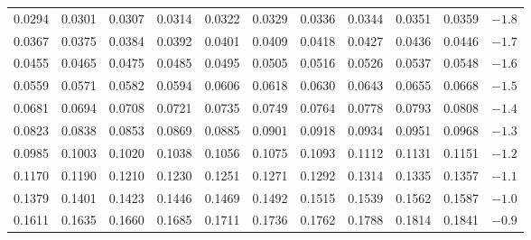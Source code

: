 \begin{table}[p]
\begin{center}
{\begin{tabular}{| rrrrr | rrrrr | c}
  \scriptsize{0.0294} & \scriptsize{0.0301} & \scriptsize{0.0307} & \scriptsize{0.0314} & \scriptsize{0.0322} & \scriptsize{0.0329} & \scriptsize{0.0336} & \scriptsize{0.0344} & \scriptsize{0.0351} & \scriptsize{0.0359} & $-1.8$ \\
  \scriptsize{0.0367} & \scriptsize{0.0375} & \scriptsize{0.0384} & \scriptsize{0.0392} & \scriptsize{0.0401} & \scriptsize{0.0409} & \scriptsize{0.0418} & \scriptsize{0.0427} & \scriptsize{0.0436} & \scriptsize{0.0446} & $-1.7$ \\
  \scriptsize{0.0455} & \scriptsize{0.0465} & \scriptsize{0.0475} & \scriptsize{0.0485} & \scriptsize{0.0495} & \scriptsize{0.0505} & \scriptsize{0.0516} & \scriptsize{0.0526} & \scriptsize{0.0537} & \scriptsize{0.0548} & $-1.6$ \\
  \scriptsize{0.0559} & \scriptsize{0.0571} & \scriptsize{0.0582} & \scriptsize{0.0594} & \scriptsize{0.0606} & \scriptsize{0.0618} & \scriptsize{0.0630} & \scriptsize{0.0643} & \scriptsize{0.0655} & \scriptsize{0.0668} & $-1.5$ \\
    \hline
  \scriptsize{0.0681} & \scriptsize{0.0694} & \scriptsize{0.0708} & \scriptsize{0.0721} & \scriptsize{0.0735} & \scriptsize{0.0749} & \scriptsize{0.0764} & \scriptsize{0.0778} & \scriptsize{0.0793} & \scriptsize{0.0808} & $-1.4$ \\
  \scriptsize{0.0823} & \scriptsize{0.0838} & \scriptsize{0.0853} & \scriptsize{0.0869} & \scriptsize{0.0885} & \scriptsize{0.0901} & \scriptsize{0.0918} & \scriptsize{0.0934} & \scriptsize{0.0951} & \scriptsize{0.0968} & $-1.3$ \\
  \scriptsize{0.0985} & \scriptsize{0.1003} & \scriptsize{0.1020} & \scriptsize{0.1038} & \scriptsize{0.1056} & \scriptsize{0.1075} & \scriptsize{0.1093} & \scriptsize{0.1112} & \scriptsize{0.1131} & \scriptsize{0.1151} & $-1.2$ \\
  \scriptsize{0.1170} & \scriptsize{0.1190} & \scriptsize{0.1210} & \scriptsize{0.1230} & \scriptsize{0.1251} & \scriptsize{0.1271} & \scriptsize{0.1292} & \scriptsize{0.1314} & \scriptsize{0.1335} & \scriptsize{0.1357} & $-1.1$ \\
  \scriptsize{0.1379} & \scriptsize{0.1401} & \scriptsize{0.1423} & \scriptsize{0.1446} & \scriptsize{0.1469} & \scriptsize{0.1492} & \scriptsize{0.1515} & \scriptsize{0.1539} & \scriptsize{0.1562} & \scriptsize{0.1587} & $-1.0$ \\
    \hline
    \hline
  \scriptsize{0.1611} & \scriptsize{0.1635} & \scriptsize{0.1660} & \scriptsize{0.1685} & \scriptsize{0.1711} & \scriptsize{0.1736} & \scriptsize{0.1762} & \scriptsize{0.1788} & \scriptsize{0.1814} & \scriptsize{0.1841} & $-0.9$ \\

\end{tabular}}
\end{center}
\end{table}
